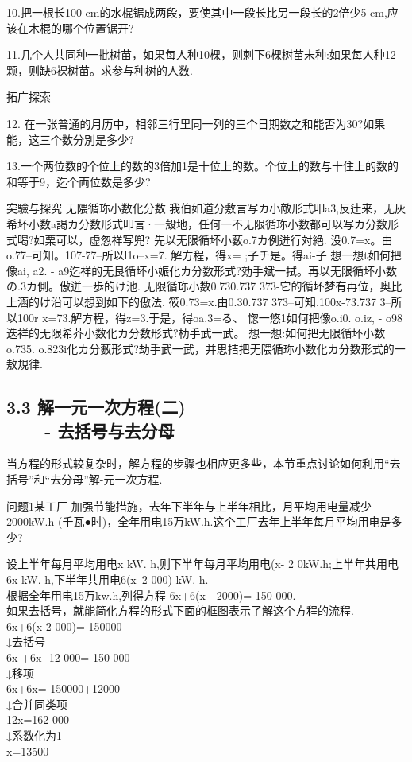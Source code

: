 \documentclass{article}
\begin{document}
\begin{article}
\begin{exercise}
10.把一根长100 cm的水棍锯成两段，要使其中一段长比另一段长的2倍少5 cm,应该在木棍的哪个位置锯开?

11.几个人共同种一批树苗，如果每人种10棵，则刺下6棵树苗未种:如果每人种12颗，则缺6裸树苗。求参与种树的人数.
\end{exercise}

拓广探索

12. 在一张普通的月历中，相邻三行里同一列的三个日期数之和能否为30?如果能，这三个数分別是多少?

13.一个两位数的个位上的数的3倍加1是十位上的数。个位上的数与十住上的数的
和等于9，迄个両位数是多少?

突驗与探究
无隈循珎小数化分数
我伯如道分敷言写カ小敵形式叩a3,反辻来，无灰希坏小数a謁カ分数形式叩言·一殼地，任何一不无限循珎小数都可以写カ分数形式喝?如栗可以，虚怱祥写兜?
先以无限循坏小薮o.7カ例迸行対絶.
没0.7=x。由o.77--可知。107-77--所以l1o--x=7. 解方程，得x= ;子チ是。得ai-子
想一想t如何把像ai, a2. - a9迄祥的无艮循坏小娠化カ分数形式?効手斌一拭。再以无限循坏小数の.3カ側。傲迸一歩的け池.
无限循珎小数0.730.737 373-它的循坏梦有再位，奥比上涵的け沿可以想到如下的傲法.
筱0.73=x.由0.30.737 373--可知.100x-73.737 3--所以100r x=73.解方程，得z=3.于是，得oa.3=る、
愡一悠1如何把像o.i0. o.iz, - o98迭祥的无限希芥小数化カ分数形式?朸手武一武。
想一想:如何把无限循坏小数o.735. o.823i化カ分藪形式?劫手武一武，并思拮把无隈循珎小数化カ分数形式的一敖規律.

\subsection{3.3 解一元一次方程(二)\\\indent \indent \indent -------
去括号与去分母}

当方程的形式较复杂时，解方程的步骤也相应更多些，本节重点讨论如何利用“去括号”和“去分母”解-元一次方程.
\begin{example}

问题1某工厂 加强节能措施，去年下半年与上半年相比，月平均用电量减少2000kW.h (千瓦●时)，全年用电15万kW.h.这个工厂去年上半年每月平均用电是多少?

设上半年每月平均用电x kW. h,则下半年每月平均用电(x- 2 0kW.h;上半年共用电6x kW. h,下半年共用电6(x--2 000) kW. h.
\\根据全年用电15万kw.h,列得方程
6x+6(x - 2000)= 150 000.\\如果去括号，就能简化方程的形式下面的框图表示了解这个方程的流程.\\
6x+6(x-2 000)= 150000\\
↓去括号\\
6x +6x- 12 000= 150 000\\
↓移项\\
6x+6x= 150000+12000\\
↓合并同类项\\12x=162 000\\
↓系数化为1\\x=13500\\


\end{example}
\end{article}
\end{document}
